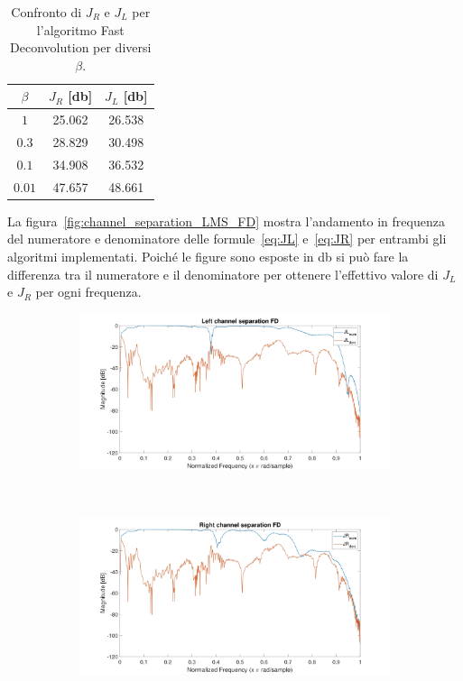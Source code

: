\documentclass[12pt,a4paper,titlepage]{article}
\begin{document}
\begin{table}[h]
\centering
\begin{tabular}{c c c}
\toprule
$\beta$   & $J_R$ [\si{\decibel}]   & $J_L$ [\si{\decibel}]   \\ \midrule
$1$ &  25.062 &  26.538\\
$0.3$ &  28.829 &  30.498\\
$0.1$&  34.908 & 36.532 \\
$0.01$ &  47.657 &  48.661 \\ \bottomrule
\end{tabular}
\caption{\label{tab:FD_result}Confronto di $J_R$ e $J_L$ per l'algoritmo Fast Deconvolution per diversi $\beta$.}
\end{table}

La figura~\ref{fig:channel_separation_LMS_FD} mostra l'andamento in frequenza del numeratore e denominatore delle formule~\eqref{eq:JL} e~\eqref{eq:JR} per entrambi gli algoritmi implementati. Poiché le figure sono esposte in \si{\decibel} si può fare la differenza tra il numeratore e il denominatore per ottenere l'effettivo valore di $J_L$ e $J_R$ per ogni frequenza.

\begin{figure}[h]
\begin{subfigure}{1\textwidth}
	\includegraphics[width=1\textwidth]{Immagini/left_channel_separation_FD}
	\caption{}
	\label{left_channel_separation_FD}
\end{subfigure}\\
\begin{subfigure}{1\textwidth}
	\includegraphics[width=1\textwidth]{Immagini/right_channel_separation_FD}
	\caption{}
	\label{right_channel_separation_FD}
\end{subfigure}
\end{figure}
\end{document}
